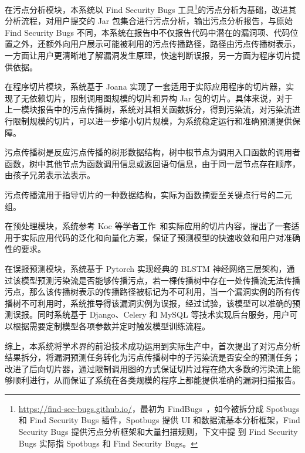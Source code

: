 在污点分析模块，本系统以 Find Security Bugs  工具\footnote{\url{https://find-sec-bugs.github.io/}，最初为 FindBugs~\cite{taint:finding}，如今被拆分成 Spotbugs 和 Find Security Bugs 插件，Spotbugs 提供 UI 和数据流基本分析框架，Find Security Bugs 提供污点分析框架和大量扫描规则，下文中提 到 Find Security Bugs 实际指 Spotbugs 和 Find Security Bugs。}的污点分析为基础，改进其分析流程，对用户提交的 Jar 包集合进行污点分析，输出污点分析报告，与原始 Find Security Bugs 不同，本系统在报告中不仅报告代码中潜在的漏洞项、代码位置之外，还额外向用户展示可能被利用的污点传播路径，路径由污点传播树表示，一方面让用户更清晰地了解漏洞发生原理，快速判断误报，另一方面为程序切片提供依据。

在程序切片模块，系统基于 Joana 实现了一套适用于实际应用程序的切片器，实现了无依赖切片，限制调用图规模的切片和异构 Jar 包的切片。具体来说，对于上一模块报告中的污点传播树，系统对其相关函数拆分，得到污染流，对污染流进行限制规模的切片，可以进一步缩小切片规模，为系统稳定运行和准确预测提供保障。

\begin{definition}[污点传播树]
    污点传播树是反应污点传播的树形数据结构，树中根节点为调用入口函数的调用者函数，树中其他节点为函数调用信息或返回语句信息，由于同一层节点存在顺序，由孩子兄弟表示法表示。
\end{definition}

\begin{definition}[污点传播流]
    污点传播流用于指导切片的一种数据结构，实际为函数摘要至关键点行号的二元组。
\end{definition}

在预处理模块，系统参考 Koc 等学者工作~\cite{Koc2019}和实际应用的切片内容，提出了一套适用于实际应用代码的泛化和向量化方案，保证了预测模型的快速收敛和用户对准确性的要求。

在误报预测模块，系统基于 Pytorch 实现经典的 BLSTM 神经网络三层架构，通过该模型预测污染流是否能够传播污点，若一棵传播树中存在一处传播流无法传播污点，那么该传播树表示的传播路径被标记为不可利用，当一个漏洞实例的所有传播树不可利用时，系统推导得该漏洞实例为误报，经过试验，该模型可以准确的预测误报。同时系统基于 Django、Celery 和 MySQL 等技术实现后台服务，用户可以根据需要定制模型各项参数并定时触发模型训练流程。

综上，本系统将学术界的前沿技术成功运用到实际生产中，首次提出了对污点分析结果拆分，将漏洞预测任务转化为污点传播树中的子污染流是否安全的预测任务；改进了后向切片器，通过限制调用图的方式保证切片过程在绝大多数的污染流上能够顺利进行，从而保证了系统在各类规模的程序上都能提供准确的漏洞扫描报告。

